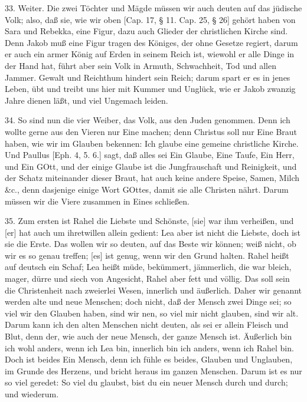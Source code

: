 33. Weiter. Die zwei Töchter und Mägde müssen wir auch deuten auf das jüdische Volk; also, daß sie, wie wir oben [Cap. 17, § 11. Cap. 25, § 26] gehört haben von Sara und Rebekka, eine Figur, dazu auch Glieder der christlichen Kirche sind. Denn Jakob muß eine Figur tragen des Königes, der ohne Gesetze regiert, darum er auch ein armer König auf Erden in seinem Reich ist, wiewohl er alle Dinge in der Hand hat, führt aber sein Volk in Armuth, Schwachheit, Tod und allen Jammer. Gewalt und Reichthum hindert sein Reich; darum spart er es in jenes Leben, übt und treibt uns hier mit Kummer und Unglück, wie er Jakob zwanzig Jahre dienen läßt, und viel Ungemach leiden.

34. So sind nun die vier Weiber, das Volk, aus den Juden genommen. Denn ich wollte gerne aus den Vieren nur Eine machen; denn Christus soll nur Eine Braut haben, wie wir im Glauben bekennen: Ich glaube eine gemeine christliche Kirche. Und Paullus [Eph. 4, 5. 6.] sagt, daß alles sei Ein Glaube, Eine Taufe, Ein Herr, und Ein GOtt, und der einige Glaube ist die Jungfrauschaft und Reinigkeit, und der Schatz miteinander dieser Braut, hat auch keine andere Speise, Samen, Milch \&c., denn dasjenige einige Wort GOttes, damit sie alle Christen nährt. Darum müssen wir die Viere zusammen in Eines schließen.

35. Zum ersten ist Rahel die Liebste und Schönste, [sie] war ihm verheißen, und [er] hat auch um ihretwillen allein gedient: Lea aber ist nicht die Liebste, doch ist sie die Erste. Das wollen wir so deuten, auf das Beste wir können; weiß nicht, ob wir es so genau treffen; [es] ist genug, wenn wir den Grund halten. Rahel heißt auf deutsch ein Schaf; Lea heißt müde, bekümmert, jämmerlich, die war bleich, mager, dürre und siech von Angesicht, Rahel aber fett und völlig. Das soll sein die Christenheit nach zweierlei Wesen, innerlich und äußerlich. Daher wir genannt werden alte und neue Menschen; doch nicht, daß der Mensch zwei Dinge sei; so viel wir den Glauben haben, sind wir
nen, so viel mir nicht glauben, sind wir alt. Darum kann ich den alten Menschen nicht deuten, als sei er allein Fleisch und Blut, denn der, wie auch der neue Mensch, der ganze Mensch ist. Äußerlich bin ich wohl anders, wenn ich Lea bin, innerlich bin ich anders, wenn ich Rahel bin. Doch ist beides Ein Mensch, denn ich fühle es beides, Glauben und Unglauben, im Grunde des Herzens, und bricht heraus im ganzen Menschen. Darum ist es nur so viel geredet: So viel du glaubst, bist du ein neuer Mensch durch und durch; und wiederum.

